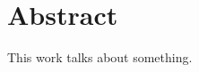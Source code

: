 \makeatletter
\@openrightfalse
\makeatother


\chapter*{Abstract}
This work talks about something.


\makeatletter
\@openrighttrue
\makeatother
